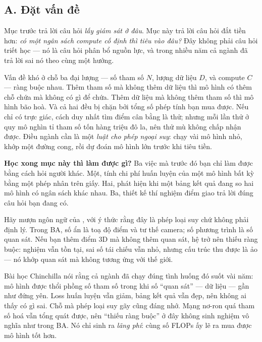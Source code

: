 \documentclass[../../../deep_learning.tex]{subfiles}
\begin{document}
\subsection{A. Đặt vấn đề}
Mục trước trả lời câu hỏi \emph{lấy giám sát ở đâu}. Mục này trả lời câu hỏi đắt tiền hơn: \emph{có một ngân sách compute cố định thì tiêu vào đâu?} Đây không phải câu hỏi triết học --- nó là câu hỏi phân bổ nguồn lực, và trong nhiều năm cả ngành đã trả lời sai nó theo cùng một hướng.

Vấn đề khó ở chỗ ba đại lượng --- số tham số $N$, lượng dữ liệu $D$, và compute $C$ --- ràng buộc nhau. Thêm tham số mà không thêm dữ liệu thì mô hình có thêm chỗ chứa mà không có gì để chứa. Thêm dữ liệu mà không thêm tham số thì mô hình bão hoà. Và cả hai đều bị chặn bởi tổng số phép tính bạn mua được. Nếu chỉ có trực giác, cách duy nhất tìm điểm cân bằng là thử; nhưng mỗi lần thử ở quy mô nghìn tỉ tham số tốn hàng triệu đô la, nên thử mù không chấp nhận được. Điều ngành cần là một \emph{luật cho phép ngoại suy}: chạy vài mô hình nhỏ, khớp một đường cong, rồi dự đoán mô hình lớn trước khi tiêu tiền.

\textbf{Học xong mục này thì làm được gì?} Ba việc mà trước đó bạn chỉ làm được bằng cách hỏi người khác. Một, tính chi phí huấn luyện của một mô hình bất kỳ bằng một phép nhân trên giấy. Hai, phát hiện khi một bảng kết quả đang so hai mô hình có ngân sách khác nhau. Ba, thiết kế thí nghiệm điểm giao trả lời đúng câu hỏi bạn đang có.

\begin{trucgiac}
Hãy mượn ngôn ngữ của , với ý thức rằng đây là phép loại suy chứ không phải định lý. Trong BA, số ẩn là toạ độ điểm và tư thế camera; số phương trình là số quan sát. Nếu bạn thêm điểm 3D mà không thêm quan sát, hệ trở nên thiếu ràng buộc: nghiệm vẫn tồn tại, sai số tái chiếu vẫn nhỏ, nhưng cấu trúc thu được là ảo --- nó khớp quan sát mà không tương ứng với thế giới.

Bài học Chinchilla nói rằng cả ngành đã chạy đúng tình huống đó suốt vài năm: mô hình được thổi phồng số tham số trong khi số ``quan sát'' ---  dữ liệu --- gần như đứng yên. Loss huấn luyện vẫn giảm, bảng kết quả vẫn đẹp, nên không ai thấy có gì sai. Chỗ mà phép loại suy gãy cũng đáng nhớ. Mạng nơ-ron quá tham số hoá vẫn tổng quát được, nên ``thiếu ràng buộc'' ở đây không sinh nghiệm vô nghĩa như trong BA. Nó chỉ sinh ra \emph{lãng phí}: cùng số FLOPs ấy lẽ ra mua được mô hình tốt hơn.
\end{trucgiac}
\end{document}
